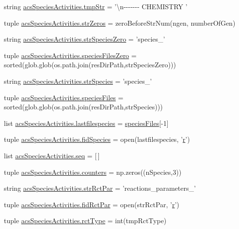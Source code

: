 \begin{DoxyCompactItemize}
\item 
string \hyperlink{a00131_a81ab8133517c53adfcdf8129e24cf5d0}{acs\+Species\+Activities.\+tmp\+Str} = '\textbackslash{}n-\/-\/-\/-\/-\/-\/-\/ C\+H\+E\+M\+I\+S\+T\+R\+Y '
\item 
tuple \hyperlink{a00131_ac53f52471f3cf1ef18465a07dc930dff}{acs\+Species\+Activities.\+str\+Zeros} = zero\+Before\+Str\+Num(ngen, number\+Of\+Gen)
\item 
string \hyperlink{a00131_a78927c369e0fe9deb29777c699af346f}{acs\+Species\+Activities.\+str\+Species\+Zero} = 'species\+\_\+'
\item 
tuple \hyperlink{a00131_a2f73b228eca2d5d0e45f781ccc21b253}{acs\+Species\+Activities.\+species\+Files\+Zero} = sorted(glob.\+glob(os.\+path.\+join(res\+Dir\+Path,str\+Species\+Zero)))
\item 
string \hyperlink{a00131_a7ad6c119fecb41b02823a95f334daa4c}{acs\+Species\+Activities.\+str\+Species} = 'species\+\_\+'
\item 
tuple \hyperlink{a00131_a7e3b3a6b0c9305e60758bf5d44e7b0f6}{acs\+Species\+Activities.\+species\+Files} = sorted(glob.\+glob(os.\+path.\+join(res\+Dir\+Path,str\+Species)))
\item 
list \hyperlink{a00131_ac7070acb2aaeb8965c57e81b6308ddd5}{acs\+Species\+Activities.\+lastfilespecies} = \hyperlink{a00028_af5703745c2c2a6af7f62da460994d9c2}{species\+Files}\mbox{[}-\/1\mbox{]}
\item 
tuple \hyperlink{a00131_a240d5b3cd72043528f4b674a8ba00a33}{acs\+Species\+Activities.\+fid\+Species} = open(lastfilespecies, '\hyperlink{a00031_ac862e7284527eb913b1351c8bfb8e079}{r}')
\item 
list \hyperlink{a00131_a50a8f7f4bae0fd037961d91206f5178c}{acs\+Species\+Activities.\+seq} = \mbox{[}$\,$\mbox{]}
\item 
tuple \hyperlink{a00131_a6afffdd046bbc3bc4fbee34b561fcae5}{acs\+Species\+Activities.\+counters} = np.\+zeros((n\+Species,3))
\item 
string \hyperlink{a00131_ab59af27efe5462ef13ae45fd7330d0b3}{acs\+Species\+Activities.\+str\+Rct\+Par} = 'reactions\+\_\+parameters\+\_\+'
\item 
tuple \hyperlink{a00131_a64247b23c199d0b0d0d60f02ec8682e3}{acs\+Species\+Activities.\+fid\+Rct\+Par} = open(str\+Rct\+Par, '\hyperlink{a00031_ac862e7284527eb913b1351c8bfb8e079}{r}')
\item 
tuple \hyperlink{a00131_abdc37f53b75138949fbbe9f9e42f1e6f}{acs\+Species\+Activities.\+rct\+Type} = int(tmp\+Rct\+Type)
\item 

\end{DoxyCompactItemize}
